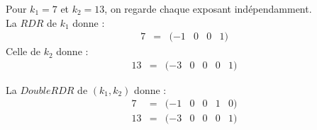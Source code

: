 \documentclass[12pt, a4paper]{memoir}
\begin{document}
 \begin{Exemple}
  Pour $k_1 = 7$ et $k_2 = 13$, on regarde chaque exposant indépendamment. \\
  La $RDR$ de $k_1$ donne : 
  $$\begin{array}{cccccc}
  7 & = & (-1 & 0 & 0 & 1)
 \end{array}$$
 Celle de $k_2$ donne :
   $$\begin{array}{ccccccc}
  13 & = & (-3 & 0 & 0 & 0 & 1)
 \end{array}$$
 
 La $DoubleRDR$ de $(k_1,k_2)$ donne :
  $$\begin{array}{ccccccc}
  7 & = & (-1 & 0 & 0 & 1 & 0) \\
  13 & = & (-3 & 0 & 0 & 0 & 1)
 \end{array}$$
 \end{Exemple}

 

 
 
 
\end{document}
